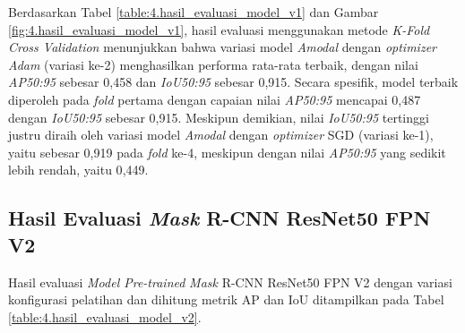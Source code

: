 Berdasarkan Tabel \ref{table:4.hasil_evaluasi_model_v1} dan Gambar \ref{fig:4.hasil_evaluasi_model_v1}, hasil evaluasi menggunakan metode \textit{K-Fold Cross Validation} menunjukkan bahwa variasi model \textit{Amodal} dengan \textit{optimizer} \textit{Adam} (variasi ke-2) menghasilkan performa rata-rata terbaik, dengan nilai \textit{AP50:95} sebesar 0{,}458 dan \textit{IoU50:95} sebesar 0{,}915. Secara spesifik, model terbaik diperoleh pada \textit{fold} pertama dengan capaian nilai \textit{AP50:95} mencapai 0{,}487 dengan \textit{IoU50:95} sebesar 0{,}915. Meskipun demikian, nilai \textit{IoU50:95} tertinggi justru diraih oleh variasi model \textit{Amodal} dengan \textit{optimizer} SGD (variasi ke-1), yaitu sebesar 0{,}919 pada \textit{fold} ke-4, meskipun dengan nilai \textit{AP50:95} yang sedikit lebih rendah, yaitu 0{,}449. \par

\subsection{Hasil Evaluasi \textit{Mask} R-CNN ResNet50 FPN V2}
Hasil evaluasi \textit{Model Pre-trained} \textit{Mask} R-CNN ResNet50 FPN V2 dengan variasi konfigurasi pelatihan dan dihitung metrik AP dan IoU ditampilkan pada Tabel \ref{table:4.hasil_evaluasi_model_v2}.

